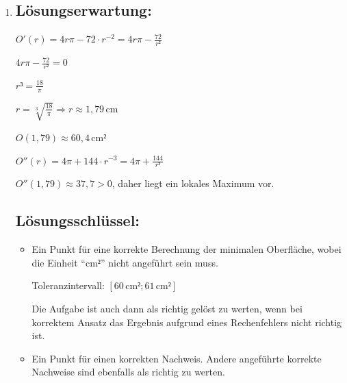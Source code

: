 \begin{langesbeispiel}
{\begin{enumerate}
\begin{itemize}
		Toleranzintervall für den unteren Wert: $[0,017; 0,02]$ 
		
		Toleranzintervall für den oberen Wert: $[0,042; 0,05]$ 
		
		Die Aufgabe ist auch dann als richtig gelöst zu werten, wenn bei korrektem Ansatz das Ergebnis aufgrund eines Rechenfehlers nicht richtig ist. 
		\item Ein Punkt für eine (sinngemäß) korrekte Angabe der entsprechenden Änderung. Andere angeführte korrekte Maßnahmen sind ebenfalls als richtig zu werten.
	\end{itemize}
	
	\item \subsection{Lösungserwartung:}
			
			$O'(r)=4r\pi-72\cdot r^{-2}=4r\pi-\frac{72}{r²}$
	
	$4r\pi-\frac{72}{r²}=0$
	
	$r³=\frac{18}{\pi}$
	
	$r=\sqrt[3]{\frac{18}{\pi}} \Rightarrow r\approx 1,79$\,cm
	
	$O(1,79)\approx 60,4$\,cm$²$
	
	$O''(r)=4\pi+144\cdot r^{-3}=4\pi+\frac{144}{r³}$
	
	$O''(1,79)\approx 37,7>0$, daher liegt ein lokales Maximum vor.

	\subsection{Lösungsschlüssel:}
	
\begin{itemize}
	\item    Ein Punkt für eine korrekte Berechnung der minimalen Oberfläche, wobei die Einheit "`cm$²$"' nicht angeführt sein muss. 
	
	Toleranzintervall: $[60\,\text{cm}²; 61\,\text{cm}²] $ 
	
	Die Aufgabe ist auch dann als richtig gelöst zu werten, wenn bei korrektem Ansatz das Ergebnis aufgrund eines Rechenfehlers nicht richtig ist. 
	\item  Ein Punkt für einen korrekten Nachweis. Andere angeführte korrekte Nachweise sind ebenfalls als richtig zu werten. 
\end{itemize}

\end{enumerate}}
		\end{langesbeispiel}